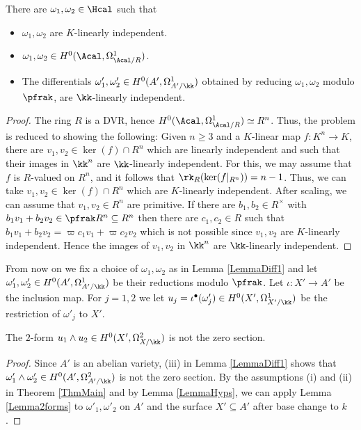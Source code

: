 \begin{lemma}
\notready\label{LemmaDiff1} There are $\omega_1,\omega_2\in \Hcal$ such that
\begin{itemize}
\item[(i)] $\omega_1,\omega_2$ are $K$-linearly independent.
\item[(ii)] $\omega_1,\omega_2\in H^0(\Acal,\Omega^1_{\Acal/R})$.
\item[(iii)] The differentials $\omega'_1,\omega'_2\in H^0(A',\Omega^1_{A'/\kk})$ obtained by reducing $\omega_1,\omega_2$ modulo $\pfrak$, are $\kk$-linearly independent.
\end{itemize}
\end{lemma}
\begin{proof} The ring $R$ is a DVR, hence $H^0(\Acal,\Omega^1_{\Acal/R})\simeq R^n$. Thus, the problem is reduced to showing the following: Given $n\ge 3$ and a $K$-linear map $f:K^n\to K$, there are $v_1,v_2\in \ker(f)\cap R^n$ which are linearly independent and such that their images in $\kk^n$ are $\kk$-linearly independent. For this, we may assume that $f$ is $R$-valued on $R^n$, and it follows that $\rk_R(\ker(f|_{R^n}))=n-1$. Thus, we can take $v_1,v_2\in \ker(f)\cap R^n$ which are $K$-linearly independent. After scaling, we can assume that $v_1,v_2\in R^n$ are primitive. If there are $b_1,b_2\in R^\times$ with $b_1 v_1+b_2 v_2\in \pfrak R^n\subseteq R^n$ then there are $c_1,c_2\in R$ such that $b_1 v_1+b_2 v_2=\varpi c_1 v_1+\varpi c_2v_2$ which is not possible since $v_1,v_2$ are $K$-linearly independent. Hence the images of  $v_1,v_2$ in $\kk^n$ are $\kk$-linearly independent.
\end{proof}

From now on we fix a choice of $\omega_1,\omega_2$ as in Lemma \ref{LemmaDiff1} and let $\omega'_1,\omega'_2\in H^0(A',\Omega^1_{A'/\kk})$ be their reductions modulo $\pfrak$. Let $\iota:X'\to A'$ be the inclusion map. For $j=1,2$ we let $u_j=\iota^\bullet(\omega'_j)\in H^0(X',\Omega^1_{X'/\kk})$ be the restriction of $\omega'_j$ to $X'$.

\begin{lemma}
\notready\label{LemmaDiff2} The $2$-form   $u_1\wedge u_2\in H^0(X',\Omega^2_{X/\kk})$ is not the zero section.
\end{lemma}
\begin{proof} Since $A'$ is an abelian variety,  (iii) in Lemma \ref{LemmaDiff1} shows that $\omega'_1\wedge \omega'_2\in H^0(A',\Omega^2_{A'/\kk})$ is not the zero section. By the assumptions (i) and (ii) in Theorem \ref{ThmMain} and by Lemma \ref{LemmaHyps}, we can apply Lemma \ref{Lemma2forms} to $\omega'_1,\omega'_2$ on $A'$ and the surface $X'\subseteq A'$ after base change to $k$.
\end{proof}

